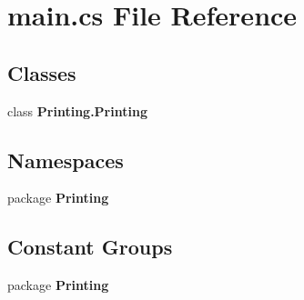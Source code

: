 \section{main.\-cs File Reference}
\label{main_8cs}
\subsection*{Classes}
\begin{DoxyCompactItemize}
\item 
class {\bf Printing.\-Printing}
\end{DoxyCompactItemize}
\subsection*{Namespaces}
\begin{DoxyCompactItemize}
\item 
package {\bf Printing}
\end{DoxyCompactItemize}
\subsection*{Constant Groups}
\begin{DoxyCompactItemize}
\item 
package {\bf Printing}
\end{DoxyCompactItemize}
